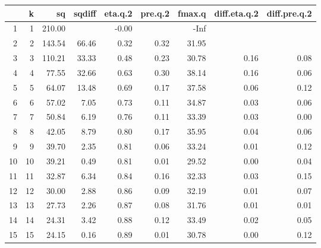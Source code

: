 \begin{table}[ht]
\centering
\begin{tabular}{rrrrrrrrr}
  \hline
 & k & sq & sqdiff & eta.q.2 & pre.q.2 & fmax.q & diff.eta.q.2 & diff.pre.q.2 \\ 
  \hline
1 &   1 & 210.00 &  & -0.00 &  & -Inf &  &  \\ 
  2 &   2 & 143.54 & 66.46 & 0.32 & 0.32 & 31.95 &  &  \\ 
  3 &   3 & 110.21 & 33.33 & 0.48 & 0.23 & 30.78 & 0.16 & 0.08 \\ 
  4 &   4 & 77.55 & 32.66 & 0.63 & 0.30 & 38.14 & 0.16 & 0.06 \\ 
  5 &   5 & 64.07 & 13.48 & 0.69 & 0.17 & 37.58 & 0.06 & 0.12 \\ 
  6 &   6 & 57.02 & 7.05 & 0.73 & 0.11 & 34.87 & 0.03 & 0.06 \\ 
  7 &   7 & 50.84 & 6.19 & 0.76 & 0.11 & 33.39 & 0.03 & 0.00 \\ 
  8 &   8 & 42.05 & 8.79 & 0.80 & 0.17 & 35.95 & 0.04 & 0.06 \\ 
  9 &   9 & 39.70 & 2.35 & 0.81 & 0.06 & 33.24 & 0.01 & 0.12 \\ 
  10 &  10 & 39.21 & 0.49 & 0.81 & 0.01 & 29.52 & 0.00 & 0.04 \\ 
  11 &  11 & 32.87 & 6.34 & 0.84 & 0.16 & 32.33 & 0.03 & 0.15 \\ 
  12 &  12 & 30.00 & 2.88 & 0.86 & 0.09 & 32.19 & 0.01 & 0.07 \\ 
  13 &  13 & 27.73 & 2.26 & 0.87 & 0.08 & 31.76 & 0.01 & 0.01 \\ 
  14 &  14 & 24.31 & 3.42 & 0.88 & 0.12 & 33.49 & 0.02 & 0.05 \\ 
  15 &  15 & 24.15 & 0.16 & 0.89 & 0.01 & 30.78 & 0.00 & 0.12 \\ 
   \hline
\end{tabular}
\end{table}
